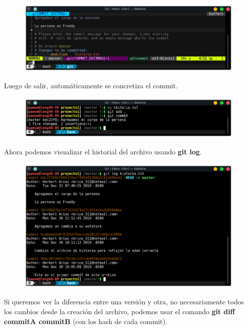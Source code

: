\documentclass{article}
\begin{document}
\begin{figure}[h!]
  \centering
  \includegraphics[scale=0.75]{./Pictures/096_wq.png}
\end{figure}

\newpage

Luego de salir, automáticamente se concretiza el commit.

\begin{figure}[h!]
  \centering
  \includegraphics[scale=0.75]{./Pictures/097_commit_ok.png}
\end{figure}

Ahora podemos visualizar el historial del archivo usando \textbf{git log}.

\begin{figure}[h!]
  \centering
  \includegraphics[scale=0.75]{./Pictures/098_git_log.png}
\end{figure}

Si queremos ver la diferencia entre una versión y otra, no necesariamente todos
los cambios desde la creación del archivo, podemos usar el comando \textbf{git
diff commitA commitB} (con los hash de cada commit).
\end{document}
